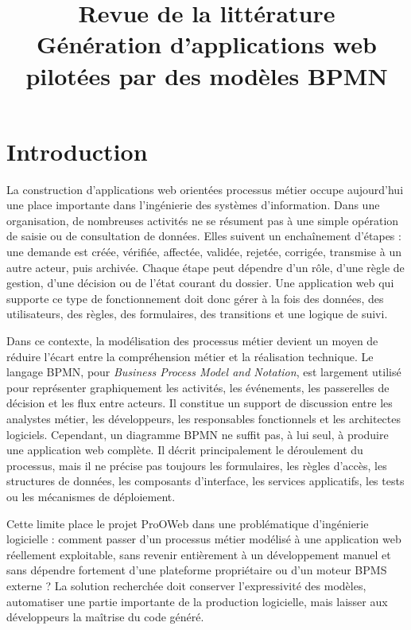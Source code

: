 \documentclass[12pt,a4paper]{article}
\title{Revue de la littérature\\
\large Génération d'applications web pilotées par des modèles BPMN}
\author{}
\date{}
\begin{document}
\maketitle

\section{Introduction}

La construction d'applications web orientées processus métier occupe aujourd'hui une place importante dans l'ingénierie des systèmes d'information. Dans une organisation, de nombreuses activités ne se résument pas à une simple opération de saisie ou de consultation de données. Elles suivent un enchaînement d'étapes : une demande est créée, vérifiée, affectée, validée, rejetée, corrigée, transmise à un autre acteur, puis archivée. Chaque étape peut dépendre d'un rôle, d'une règle de gestion, d'une décision ou de l'état courant du dossier. Une application web qui supporte ce type de fonctionnement doit donc gérer à la fois des données, des utilisateurs, des règles, des formulaires, des transitions et une logique de suivi.

Dans ce contexte, la modélisation des processus métier devient un moyen de réduire l'écart entre la compréhension métier et la réalisation technique. Le langage BPMN, pour \textit{Business Process Model and Notation}, est largement utilisé pour représenter graphiquement les activités, les événements, les passerelles de décision et les flux entre acteurs. Il constitue un support de discussion entre les analystes métier, les développeurs, les responsables fonctionnels et les architectes logiciels. Cependant, un diagramme BPMN ne suffit pas, à lui seul, à produire une application web complète. Il décrit principalement le déroulement du processus, mais il ne précise pas toujours les formulaires, les règles d'accès, les structures de données, les composants d'interface, les services applicatifs, les tests ou les mécanismes de déploiement.

Cette limite place le projet ProOWeb dans une problématique d'ingénierie logicielle : comment passer d'un processus métier modélisé à une application web réellement exploitable, sans revenir entièrement à un développement manuel et sans dépendre fortement d'une plateforme propriétaire ou d'un moteur BPMS externe ? La solution recherchée doit conserver l'expressivité des modèles, automatiser une partie importante de la production logicielle, mais laisser aux développeurs la maîtrise du code généré.
\end{document}
